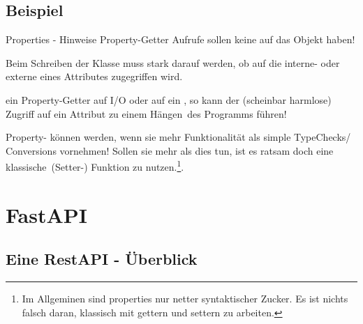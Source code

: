 \documentclass[12pt, aspectratio=169, usepdftitle=false]{beamer}
\begin{document}
\subsection{Beispiel}


\begin{frame}{Properties - Hinweise}
	     Property-Getter Aufrufe sollen keine  auf das Objekt haben!
		
		\medskip
		
		Beim Schreiben der Klasse muss stark darauf  werden, ob auf die interne- oder externe  eines Attributes zugegriffen wird.
		
		\medskip
		
		 ein Property-Getter auf I/O oder auf ein , so kann der (scheinbar harmlose) Zugriff auf ein Attribut zu einem \glqq Hängen\grqq~des Programms führen!
		
		\medskip
		
		Property- können  werden, wenn sie mehr Funktionalität als simple TypeChecks/ Conversions vornehmen!\newline
		Sollen sie mehr als dies tun, ist es ratsam doch eine \glqq klassische\grqq~(Setter-) Funktion zu nutzen.\footnote{Im Allgeminen sind properties nur netter syntaktischer Zucker. Es ist nichts falsch daran, klassisch mit gettern und settern zu arbeiten.}.
		
\end{frame}


\framecardfragen

\section{FastAPI}

\subsection{Eine RestAPI - Überblick}
\end{document}
